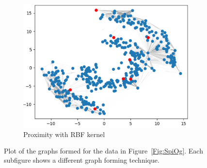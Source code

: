 \documentclass[12pt]{amsart}
\begin{document}
\begin{figure}[ht]
\begin{subfigure}{0.475\linewidth}
    \includegraphics[width=0.8\linewidth]{Figures/SpiProx.png} 
    \caption{Proximity with RBF kernel} 
    \label{Fig:SpiProx}
  \end{subfigure} 
  \caption{Plot of the graphs formed for the data in Figure~\ref{Fig:SpiOg}. Each subfigure shows a different graph forming technique.}
  \label{Fig:SpiGraphs} 
\end{figure}
\end{document}
